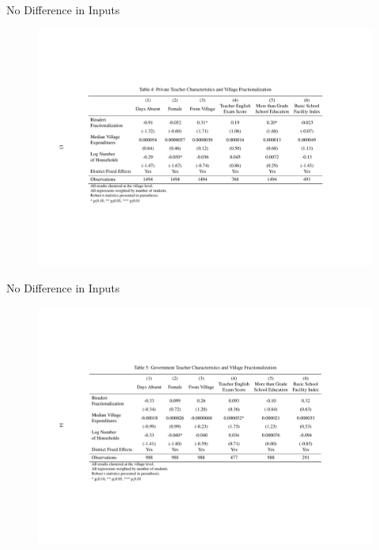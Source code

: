 \documentclass[handout]{beamer}
\begin{document}
\begin{frame}{No Difference in Inputs}
	\begin{figure}[htb]
		\begin{center}
		\includegraphics[scale=0.5]{tables/Private_teacher_quality.pdf}
		\end{center}
	\end{figure}
\end{frame}

\begin{frame}{No Difference in Inputs}
	\begin{figure}[htb]
		\begin{center}
		\includegraphics[scale=0.5]{tables/govt_teacher_quality.pdf}
		\end{center}
	\end{figure}
	
\end{frame}
\end{document}
